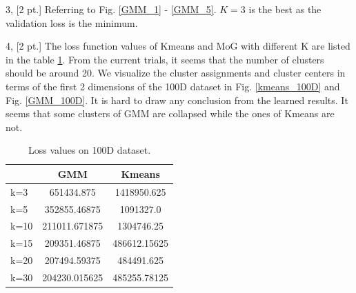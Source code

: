 \documentclass[12pt,letterpaper]{article}
\begin{document}
3, [2 pt.] Referring to Fig. \ref{GMM_1} - \ref{GMM_5}. $K = 3$ is the best as the validation loss is the minimum.

4, [2 pt.] The loss function values of Kmeans and MoG with different K are listed in the table \ref{loss_table}. From the current trials, it seems that the number of clusters should be around 20. We visualize the cluster assignments and cluster centers in terms of the first 2 dimensions of the 100D dataset in Fig. \ref{kmeans_100D} and Fig. \ref{GMM_100D}. It is hard to draw any conclusion from the learned results. It seems that some clusters of GMM are collapsed while the ones of Kmeans are not.

\begin{table}
\centering
\begin{tabular}{ l | c c }
& GMM & Kmeans \\ \hline
k=3 & 651434.875 & 1418950.625 \\ \hline
k=5 & 352855.46875 & 1091327.0 \\ \hline
k=10 & 211011.671875 & 1304746.25 \\ \hline
k=15 & 209351.46875 & 486612.15625 \\ \hline
k=20 & 207494.59375 & 484491.625 \\ \hline
k=30 & 204230.015625 & 485255.78125
\end{tabular}
\caption{Loss values on 100D dataset.}
\label{loss_table}
\end{table}
\end{document}
